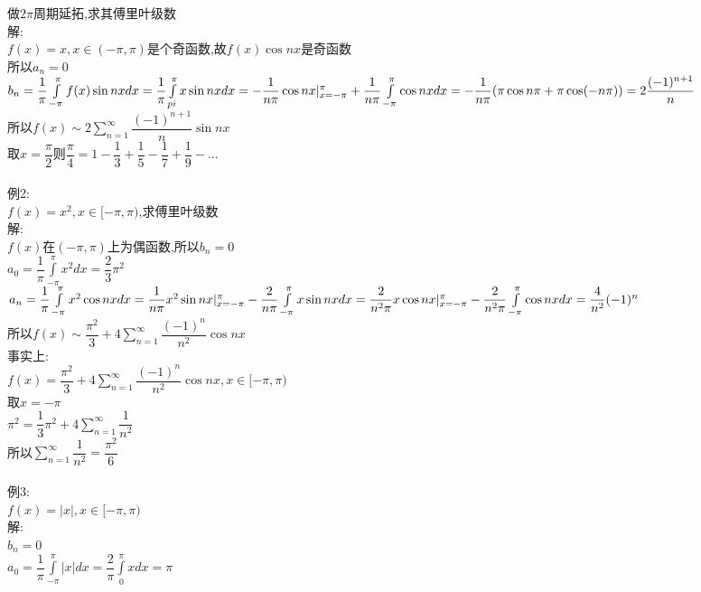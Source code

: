 \documentclass[11pt, a4paper, UTF8]{ctexart}
\begin{document}
做$ 2\pi $周期延拓,求其傅里叶级数\\
解:\\
$ f(x)=x,x\in(-\pi,\pi) $是个奇函数,故$ f(x)\cos nx $是奇函数\\
所以$ a_n=0 $\\
$ b_n=\dfrac{1}{\pi}\int\limits_{-\pi}^{\pi}f(x)\sin nxdx=\dfrac{1}{\pi}\int\limits_{\-pi}^{\pi}x\sin nxdx=-\dfrac{1}{n\pi}\cos nx|_{x=-\pi}^{\pi}+\dfrac{1}{n\pi}\int\limits_{-\pi}^{\pi}\cos nxdx\\
=-\dfrac{1}{n\pi}(\pi\cos n\pi+\pi\cos(-n\pi))=2\dfrac{(-1)^{n+1}}{n} $\\
所以$ f(x)\sim 2\sum_{n=1}^{\infty}\dfrac{(-1)^{n+1}}{n}\sin nx $\\
取$ x=\dfrac{\pi}{2} $则$ \dfrac{\pi}{4}=1-\dfrac{1}{3}+\dfrac{1}{5}-\dfrac{1}{7}+\dfrac{1}{9}-... $\\
\\
例2:\\
$ f(x)=x^2,x\in[-\pi,\pi) $,求傅里叶级数\\
解:\\
$ f(x) $在$ (-\pi,\pi) $上为偶函数,所以$ b_n=0 $\\
$ a_0=\dfrac{1}{\pi}\int\limits_{-\pi}^{\pi}x^2dx=\dfrac{2}{3}\pi^2 $\\
$ a_n=\dfrac{1}{\pi}\int\limits_{-\pi}^{\pi}x^2\cos nxdx=\dfrac{1}{n\pi}x^2\sin nx|_{x=-\pi}^{\pi}-\dfrac{2}{n\pi}\int\limits_{-\pi}^{\pi}x\sin nxdx\\
=\dfrac{2}{n^2\pi}x\cos nx|_{x=-\pi}^{\pi}-\dfrac{2}{n^2\pi}\int\limits_{-\pi}^{\pi}\cos nxdx=\dfrac{4}{n^2}(-1)^n $\\
所以$ f(x)\sim\dfrac{\pi^2}{3}+4\sum\limits_{n=1}^{\infty}\dfrac{(-1)^n}{n^2}\cos nx $\\
事实上:\\
$ f(x)=\dfrac{\pi^2}{3}+4\sum\limits_{n=1}^{\infty}\dfrac{(-1)^n}{n^2}\cos nx,x\in[-\pi,\pi) $\\
取$ x=-\pi $\\
$ \pi^2=\dfrac{1}{3}\pi^2+4\sum\limits_{n=1}^{\infty}\dfrac{1}{n^2} $\\
所以$ \sum\limits_{n=1}^{\infty}\dfrac{1}{n^2}=\dfrac{\pi^2}{6} $\\
\\
例3:\\
$ f(x)=|x|,x\in[-\pi,\pi) $\\
解:\\
$ b_n=0 $\\
$ a_0=\dfrac{1}{\pi}\int\limits_{-\pi}^{\pi}|x|dx=\dfrac{2}{\pi}\int\limits_{0}^{\pi}xdx=\pi $\\
\end{document}
